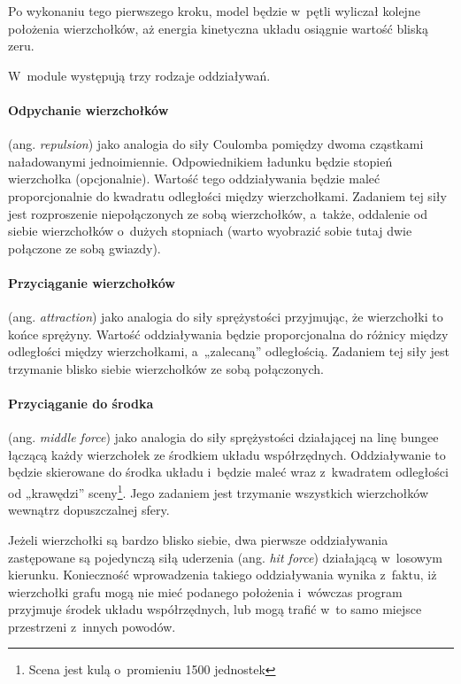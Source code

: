 \documentclass[a4paper,onecolumn,oneside,12pt]{mwart}
\begin{document}
Po wykonaniu tego pierwszego kroku, model będzie w~pętli wyliczał kolejne
położenia wierzchołków, aż energia kinetyczna układu osiągnie wartość
bliską zeru.

W~module występują trzy rodzaje oddziaływań.

\paragraph{Odpychanie wierzchołków} (ang. {\it repulsion}) jako analogia do siły Coulomba pomiędzy
dwoma cząstkami naładowanymi jednoimiennie.  Odpowiednikiem ładunku będzie
stopień wierzchołka (opcjonalnie).  Wartość tego oddziaływania będzie maleć
proporcjonalnie do kwadratu odległości między wierzchołkami.  Zadaniem tej
siły jest rozproszenie niepołączonych ze sobą wierzchołków, a~także,
oddalenie od siebie wierzchołków o~dużych stopniach (warto wyobrazić sobie
tutaj dwie połączone ze sobą gwiazdy).

\paragraph{Przyciąganie wierzchołków} (ang. {\it attraction}) jako analogia do siły sprężystości
przyjmując, że wierzchołki to końce sprężyny.  Wartość oddziaływania będzie
proporcjonalna do różnicy między odległości między wierzchołkami,
a~„zalecaną” odległością.  Zadaniem tej siły jest trzymanie blisko siebie
wierzchołków ze sobą połączonych.

\paragraph{Przyciąganie do środka} (ang. {\it middle force}) jako analogia do siły sprężystości
działającej na linę bungee łączącą każdy wierzchołek ze środkiem układu
współrzędnych.  Oddziaływanie to będzie skierowane do środka układu
i~będzie maleć wraz z~kwadratem odległości od „krawędzi”
sceny\footnote{Scena jest kulą o~promieniu 1500 jednostek}.  Jego zadaniem
jest trzymanie wszystkich wierzchołków wewnątrz dopuszczalnej sfery.

Jeżeli wierzchołki są bardzo blisko siebie, dwa pierwsze oddziaływania
zastępowane są pojedynczą siłą uderzenia (ang. {\it hit force}) działającą
w~losowym kierunku. Konieczność wprowadzenia takiego oddziaływania wynika
z~faktu, iż wierzchołki grafu mogą nie mieć podanego położenia i~wówczas
program przyjmuje środek układu współrzędnych, lub mogą trafić w~to samo
miejsce przestrzeni z~innych powodów.
\end{document}
